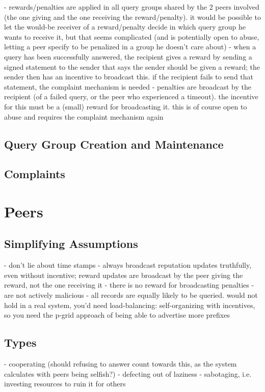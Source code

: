 - rewards/penalties are applied in all query groups shared by the 2 peers
  involved (the one giving and the one receiving the reward/penalty). it would
  be possible to let the would-be receiver of a reward/penalty decide in which
  query group he wants to receive it, but that seems complicated (and is
  potentially open to abuse, letting a peer specify to be penalized in a group
  he doesn't care about)
- when a query has been successfully answered, the recipient gives a reward by
  sending a signed statement to the sender that says the sender should be given
  a reward; the sender then has an incentive to broadcast this. if the recipient
  fails to send that statement, the complaint mechanism is needed
- penalties are broadcast by the recipient (of a failed query, or the peer who
  experienced a timeout). the incentive for this must be a (small) reward for
  broadcasting it. this is of course open to abuse and requires the complaint
  mechanism again
\subsection{Query Group Creation and Maintenance}
\subsection{Complaints}

\section{Peers}
\subsection{Simplifying Assumptions}
- don't lie about time stamps
- always broadcast reputation updates truthfully, even without incentive; reward
  updates are broadcast by the peer giving the reward, not the one receiving it
- there is no reward for broadcasting penalties
- are not actively malicious
- all records are equally likely to be queried. would not hold in a real system,
  you'd need load-balancing: self-organizing with incentives, so you need the
  p-grid approach of being able to advertise more prefixes
\subsection{Types}
- cooperating (should refusing to answer count towards this, as the system
  calculates with peers being selfish?)
- defecting out of laziness
- sabotaging, i.e. investing resources to ruin it for others

